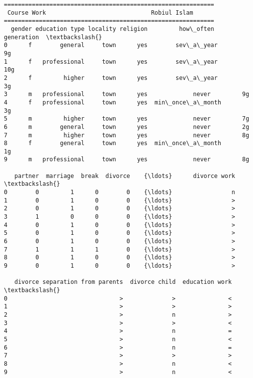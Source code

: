 \documentclass[11pt]{article}
\begin{document}
    \begin{Verbatim}[commandchars=\\\{\}]
============================================================
 Course Work                              Robiul Islam      
============================================================
  gender education type locality religion         how\_often generation  \textbackslash{}
0      f        general     town      yes        sev\_a\_year         9g   
1      f   professional     town      yes        sev\_a\_year        10g   
2      f         higher     town      yes        sev\_a\_year         3g   
3      m   professional     town      yes             never         9g   
4      f   professional     town      yes  min\_once\_a\_month         3g   
5      m         higher     town      yes             never         7g   
6      m        general     town      yes             never         2g   
7      m         higher     town      yes             never         8g   
8      f        general     town      yes  min\_once\_a\_month         1g   
9      m   professional     town      yes             never         8g   

   partner  marriage  break  divorce    {\ldots}      divorce work  \textbackslash{}
0        0         1      0        0    {\ldots}                 n   
1        0         1      0        0    {\ldots}                 >   
2        0         1      0        0    {\ldots}                 >   
3        1         0      0        0    {\ldots}                 >   
4        0         1      0        0    {\ldots}                 >   
5        0         1      0        0    {\ldots}                 >   
6        0         1      0        0    {\ldots}                 >   
7        1         1      1        0    {\ldots}                 >   
8        0         1      0        0    {\ldots}                 >   
9        0         1      0        0    {\ldots}                 >   

   divorce separation from parents  divorce child  education work  \textbackslash{}
0                                >              >               <   
1                                >              >               >   
2                                >              n               >   
3                                >              >               <   
4                                >              n               =   
5                                >              n               <   
6                                >              n               =   
7                                >              >               >   
8                                >              n               <   
9                                >              n               <   


\end{Verbatim}
\end{document}
